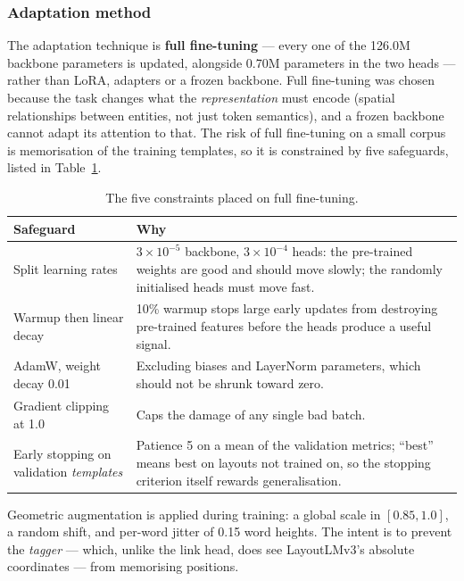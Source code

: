 \documentclass[11pt,a4paper]{article}
\begin{document}
\subsubsection{Adaptation method}

The adaptation technique is \textbf{full fine-tuning} --- every one of the 126.0M backbone
parameters is updated, alongside 0.70M parameters in the two heads --- rather than LoRA, adapters
or a frozen backbone. Full fine-tuning was chosen because the task changes what the
\emph{representation} must encode (spatial relationships between entities, not just token
semantics), and a frozen backbone cannot adapt its attention to that. The risk of full
fine-tuning on a small corpus is memorisation of the training templates, so it is constrained by
five safeguards, listed in Table~\ref{tab:safeguards}.

\begin{table}[htbp]
\centering\small
\begin{tabular}{@{}p{3.5cm}p{9.9cm}@{}}
\toprule
\textbf{Safeguard} & \textbf{Why} \\
\midrule
Split learning rates & $3\times10^{-5}$ backbone, $3\times10^{-4}$ heads: the pre-trained weights
are good and should move slowly; the randomly initialised heads must move fast. \\
Warmup then linear decay & 10\% warmup stops large early updates from destroying pre-trained
features before the heads produce a useful signal. \\
AdamW, weight decay 0.01 & Excluding biases and LayerNorm parameters, which should not be
shrunk toward zero. \\
Gradient clipping at 1.0 & Caps the damage of any single bad batch. \\
Early stopping on validation \emph{templates} & Patience 5 on a mean of the validation metrics;
``best'' means best on layouts not trained on, so the stopping criterion itself rewards
generalisation. \\
\bottomrule
\end{tabular}
\caption{The five constraints placed on full fine-tuning.}
\label{tab:safeguards}
\end{table}

Geometric augmentation is applied during training: a global scale in $[0.85, 1.0]$, a random
shift, and per-word jitter of 0.15 word heights. The intent is to prevent the \emph{tagger} ---
which, unlike the link head, does see LayoutLMv3's absolute coordinates --- from memorising
positions.
\end{document}
